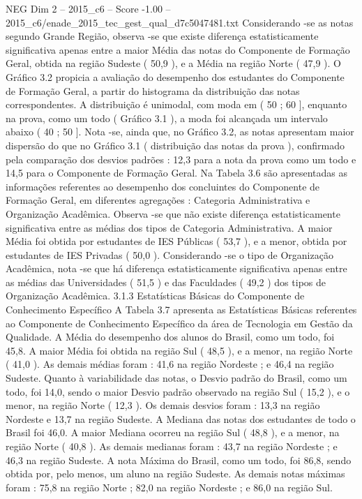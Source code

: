 \begin{textsample}{NEG Dim 2 – 2015\_c6 – Score -1.00 – 2015\_c6/enade\_2015\_tec\_gest\_qual\_d7c5047481.txt}
Considerando -se as notas segundo Grande Região, observa -se que existe diferença estatisticamente significativa apenas entre a maior Média das notas do Componente de Formação Geral, obtida na região Sudeste ( 50,9 ), e a Média na região Norte ( 47,9 ).
O Gráfico 3.2 propicia a avaliação do desempenho dos estudantes do Componente de Formação Geral, a partir do histograma da distribuição das notas correspondentes.
A distribuição é unimodal, com moda em ( 50 ; 60 ], enquanto na prova, como um todo ( Gráfico 3.1 ), a moda foi alcançada um intervalo abaixo ( 40 ; 50 ].
Nota -se, ainda que, no Gráfico 3.2, as notas apresentam maior dispersão do que no Gráfico 3.1 ( distribuição das notas da prova ), confirmado pela comparação dos desvios padrões : 12,3 para a nota da prova como um todo e 14,5 para o Componente de Formação Geral.
Na Tabela 3.6 são apresentadas as informações referentes ao desempenho dos concluintes do Componente de Formação Geral, em diferentes agregações : Categoria Administrativa e Organização Acadêmica.
Observa -se que não existe diferença estatisticamente significativa entre as médias dos tipos de Categoria Administrativa.
A maior Média foi obtida por estudantes de IES Públicas ( 53,7 ), e a menor, obtida por estudantes de IES Privadas ( 50,0 ).
Considerando -se o tipo de Organização Acadêmica, nota -se que há diferença estatisticamente significativa apenas entre as médias das Universidades ( 51,5 ) e das Faculdades ( 49,2 ) dos tipos de Organização Acadêmica. 3.1.3 Estatísticas Básicas do Componente de Conhecimento Específico A Tabela 3.7 apresenta as Estatísticas Básicas referentes ao Componente de Conhecimento Específico da área de Tecnologia em Gestão da Qualidade.
A Média do desempenho dos alunos do Brasil, como um todo, foi 45,8.
A maior Média foi obtida na região Sul ( 48,5 ), e a menor, na região Norte ( 41,0 ).
As demais médias foram : 41,6 na região Nordeste ; e 46,4 na região Sudeste.
Quanto à variabilidade das notas, o Desvio padrão do Brasil, como um todo, foi 14,0, sendo o maior Desvio padrão observado na região Sul ( 15,2 ), e o menor, na região Norte ( 12,3 ).
Os demais desvios foram : 13,3 na região Nordeste e 13,7 na região Sudeste.
A Mediana das notas dos estudantes de todo o Brasil foi 46,0.
A maior Mediana ocorreu na região Sul ( 48,8 ), e a menor, na região Norte ( 40,8 ).
As demais medianas foram : 43,7 na região Nordeste ; e 46,3 na região Sudeste.
A nota Máxima do Brasil, como um todo, foi 86,8, sendo obtida por, pelo menos, um aluno na região Sudeste.
As demais notas máximas foram : 75,8 na região Norte ; 82,0 na região Nordeste ; e 86,0 na região Sul.

\end{textsample}
